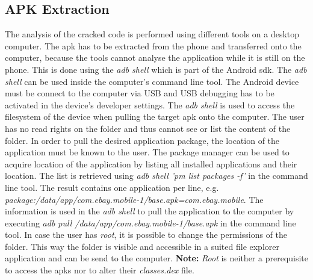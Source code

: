 \subsection{APK Extraction} \label{subsection:tools-apk}
The analysis of the cracked code is performed using different tools on a desktop computer.
The \gls{apk} has to be extracted from the phone and transferred onto the computer, because the tools cannot analyse the application while it is still on the phone.
This is done using the \textit{adb shell} which is part of the Android \gls{sdk}.
\newline
The \textit{adb shell} can be used inside the computer’s command line tool.
The Android device must be connect to the computer via USB and USB debugging has to be activated in the device’s developer settings.
The \textit{adb shell} is used to access the filesystem of the device when pulling the target \gls{apk} onto the computer.
The user has no read rights on the folder and thus cannot see or list the content of the folder.
In order to pull the desired application package, the location of the application must be known to the user.
The package manager can be used to acquire location of the application by listing all installed applications and their location.
The list is retrieved using \textit{adb shell 'pm list packages -f'} in the command line tool.
The result contains one application per line, e.g. \textit{package:/data/app/com.ebay.mobile-1/base.apk=com.ebay.mobile}.
The information is used in the \textit{adb shell} to pull the application to the computer by executing \textit{adb pull /data/app/com.ebay.mobile-1/base.apk} in the command line tool.
\newline
In case the user has \textit{root}, it is possible to change the permissions of the folder.
This way the folder is visible and accessible in a suited file explorer application and can be send to the computer.
\newline
\newline
\textbf{Note:} \textit{Root} is neither a prerequisite to access the \gls{apk}s nor to alter their \textit{classes.dex} file.
